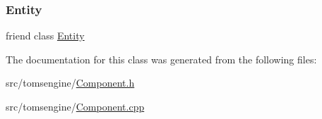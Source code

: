 \subsubsection{\texorpdfstring{Entity}{Entity}}
{\footnotesize\ttfamily friend class \mbox{\hyperlink{classtomsengine_1_1_entity}{Entity}}\hspace{0.3cm}{\ttfamily [friend]}}



The documentation for this class was generated from the following files\+:\begin{DoxyCompactItemize}
\item 
src/tomsengine/\mbox{\hyperlink{_component_8h}{Component.\+h}}\item 
src/tomsengine/\mbox{\hyperlink{_component_8cpp}{Component.\+cpp}}\end{DoxyCompactItemize}
